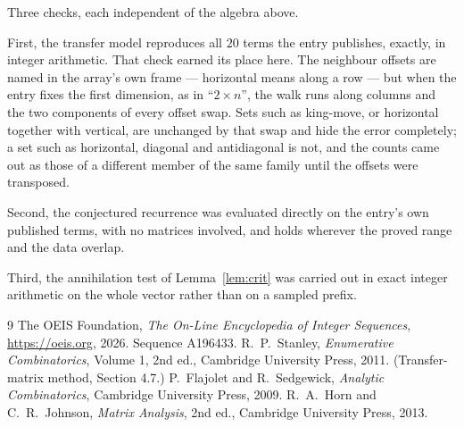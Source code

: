 \documentclass[11pt,a4paper]{article}
\theoremstyle{plain}
\theoremstyle{definition}
\begin{document}
Three checks, each independent of the algebra above.

First, the transfer model reproduces all $20$ terms the entry publishes, exactly, in
integer arithmetic. That check earned its place here. The neighbour offsets are named in the
array's own frame --- horizontal means along a row --- but when the entry fixes the first
dimension, as in ``$2\times n$'', the walk runs along columns and the two components of every
offset swap. Sets such as king-move, or horizontal together with vertical, are unchanged by
that swap and hide the error completely; a set such as horizontal, diagonal and antidiagonal
is not, and the counts came out as those of a different member of the same family until the
offsets were transposed.

Second, the conjectured recurrence was evaluated directly on the entry's own published terms,
with no matrices involved, and holds wherever the proved range and the data overlap.

Third, the annihilation test of Lemma~\ref{lem:crit} was carried out in exact integer
arithmetic on the whole vector rather than on a sampled prefix.

\begin{thebibliography}{9}
 The OEIS Foundation, \emph{The On-Line Encyclopedia of Integer
Sequences}, \url{https://oeis.org}, 2026. Sequence A196433.
 R.~P.~Stanley, \emph{Enumerative Combinatorics}, Volume 1, 2nd ed.,
Cambridge University Press, 2011. (Transfer-matrix method, Section 4.7.)
 P.~Flajolet and R.~Sedgewick, \emph{Analytic Combinatorics}, Cambridge
University Press, 2009.
 R.~A.~Horn and C.~R.~Johnson, \emph{Matrix Analysis}, 2nd ed., Cambridge
University Press, 2013.
\end{thebibliography}
\end{document}
